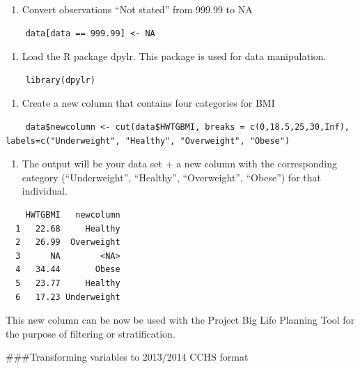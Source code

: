 \documentclass[]{book}
\providecommand{\tightlist}{%
  \setlength{\itemsep}{0pt}\setlength{\parskip}{0pt}}
\begin{document}
\begin{enumerate}
\def\labelenumi{\arabic{enumi}.}
\tightlist
\item
  Convert observations ``Not stated'' from 999.99 to NA
\end{enumerate}

\begin{verbatim}
    data[data == 999.99] <- NA
\end{verbatim}

\begin{enumerate}
\def\labelenumi{\arabic{enumi}.}
\setcounter{enumi}{1}
\tightlist
\item
  Load the R package dpylr. This package is used for data manipulation.
\end{enumerate}

\begin{verbatim}
    library(dpylr)
\end{verbatim}

\begin{enumerate}
\def\labelenumi{\arabic{enumi}.}
\setcounter{enumi}{2}
\tightlist
\item
  Create a new column that contains four categories for BMI
\end{enumerate}

\begin{verbatim}
    data$newcolumn <- cut(data$HWTGBMI, breaks = c(0,18.5,25,30,Inf),  labels=c("Underweight", "Healthy", "Overweight", "Obese")
\end{verbatim}

\begin{enumerate}
\def\labelenumi{\arabic{enumi}.}
\setcounter{enumi}{3}
\tightlist
\item
  The output will be your data set + a new column with the corresponding category (``Underweight'', ``Healthy'', ``Overweight'', ``Obese'') for that individual.
\end{enumerate}

\begin{verbatim}
    HWTGBMI   newcolumn
  1   22.68     Healthy
  2   26.99  Overweight
  3      NA        <NA>
  4   34.44       Obese
  5   23.77     Healthy
  6   17.23 Underweight
\end{verbatim}

This new column can be now be used with the Project Big Life Planning Tool for the purpose of filtering or stratification.

\#\#\#Transforming variables to 2013/2014 CCHS format
\end{document}
